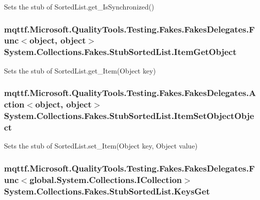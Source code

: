 Sets the stub of Sorted\-List.\-get\-\_\-\-Is\-Synchronized()

\hypertarget{class_system_1_1_collections_1_1_fakes_1_1_stub_sorted_list_af6e2a083fa336d256a816df1785a29fa}{
\subsubsection[{Item\-Get\-Object}]{\setlength{\rightskip}{0pt plus 5cm}mqttf.\-Microsoft.\-Quality\-Tools.\-Testing.\-Fakes.\-Fakes\-Delegates.\-Func$<$object, object$>$ System.\-Collections.\-Fakes.\-Stub\-Sorted\-List.\-Item\-Get\-Object}}\label{class_system_1_1_collections_1_1_fakes_1_1_stub_sorted_list_af6e2a083fa336d256a816df1785a29fa}


Sets the stub of Sorted\-List.\-get\-\_\-\-Item(\-Object key)

\hypertarget{class_system_1_1_collections_1_1_fakes_1_1_stub_sorted_list_a81b386fab02b36c80cb26da809aa886a}{
\subsubsection[{Item\-Set\-Object\-Object}]{\setlength{\rightskip}{0pt plus 5cm}mqttf.\-Microsoft.\-Quality\-Tools.\-Testing.\-Fakes.\-Fakes\-Delegates.\-Action$<$object, object$>$ System.\-Collections.\-Fakes.\-Stub\-Sorted\-List.\-Item\-Set\-Object\-Object}}\label{class_system_1_1_collections_1_1_fakes_1_1_stub_sorted_list_a81b386fab02b36c80cb26da809aa886a}


Sets the stub of Sorted\-List.\-set\-\_\-\-Item(\-Object key, Object value)

\hypertarget{class_system_1_1_collections_1_1_fakes_1_1_stub_sorted_list_a7d6851d1111a95498153f020cf72999b}{
\subsubsection[{Keys\-Get}]{\setlength{\rightskip}{0pt plus 5cm}mqttf.\-Microsoft.\-Quality\-Tools.\-Testing.\-Fakes.\-Fakes\-Delegates.\-Func$<$global.\-System.\-Collections.\-I\-Collection$>$ System.\-Collections.\-Fakes.\-Stub\-Sorted\-List.\-Keys\-Get}}\label{class_system_1_1_collections_1_1_fakes_1_1_stub_sorted_list_a7d6851d1111a95498153f020cf72999b}


